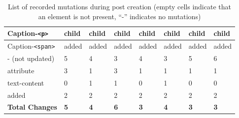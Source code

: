 \documentclass[a4paper, 12pt]{article}
\begin{document}
\begin{table}[ht]
\begin{adjustbox}{angle=90}
\begin{tabular}{|l|l|l|l|l|l|l|l|}
      Caption-\verb|<p>|              & child               & child         & child               & child         & child           & child           & child           \\ \hline
      Caption-\verb|<span>|           & added               & added         & added               & added         & added           & added           & added           \\ \hline
      \hline
      - (not updated)                 & 5                   & 4             & 3                   & 4             & 3               & 5               & 6               \\ \hline
      \hline
      attribute                       & 3                   & 1             & 3                   & 1             & 1               & 1               & 1               \\ \hline
      text-content                    & 0                   & 1             & 1                   & 0             & 1               & 0               & 0               \\ \hline
      added                           & 2                   & 2             & 2                   & 2             & 2               & 2               & 2               \\ \hline
      \hline
      \textbf{Total Changes}          & \textbf{5}        & \textbf{4}      & \textbf{6}          & \textbf{3}    & \textbf{4}      & \textbf{3}      & \textbf{3}      \\ \hline
    \end{tabular}
  \end{adjustbox}
  \caption{List of recorded mutations during post creation (empty cells indicate that an element is not present, \enquote{-} indicates no mutations)}
  \label{tab:mutations:postCreation}
\end{table}
\end{document}
